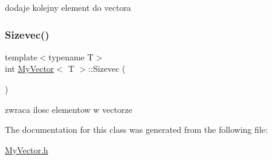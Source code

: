 dodaje kolejny element do vectora 

\mbox{\label{class_my_vector_a626cb4a9b2bae47d8752a3b82c413a4d}} 
\subsubsection{\texorpdfstring{Sizevec()}{Sizevec()}}
{\footnotesize\ttfamily template$<$typename T$>$ \\
int \hyperlink{class_my_vector}{My\+Vector}$<$ T $>$\+::Sizevec (\begin{DoxyParamCaption}{ }\end{DoxyParamCaption})\hspace{0.3cm}{\ttfamily [inline]}}



zwraca ilosc elementow w vectorze 



The documentation for this class was generated from the following file\+:\begin{DoxyCompactItemize}
\item 
\hyperlink{_my_vector_8h}{My\+Vector.\+h}\end{DoxyCompactItemize}
